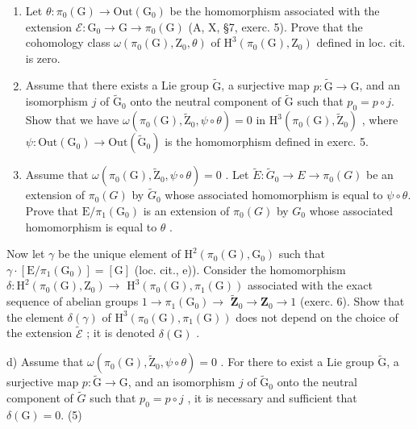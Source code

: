 \begin{enumerate}
\def\labelenumi{\alph{enumi})}
\item
  Let \(\theta\colon\pi_{0}(\mathrm{G})\to\mathrm{Out}(\mathrm{G}_{0})\) be the homomorphism associated with the extension \(\mathcal{E}\colon\mathrm{G}_{0}\to\mathrm{G}\to\pi_{0}(\mathrm{G})\) (A, X, §7, exerc. 5). Prove that the cohomology class \(\omega(\pi_{0}(\mathrm{G}),\mathrm{Z}_{0},\theta)\) of \(\mathrm{H}^{3}(\pi_{0}(\mathrm{G}),\mathrm{Z}_{0})\) defined in loc. cit. is zero.
\item
  Assume that there exists a Lie group \(\widetilde{\mathrm{G}}\), a surjective map \(p\colon\widetilde{\mathrm{G}}\to\mathrm{G}\), and an isomorphism \(j\) of \(\widetilde{\mathrm{G}}_{0}\) onto the neutral component of \(\widetilde{\mathrm{G}}\) such that \(p_{0}=p\circ j\). Show that we have \(\omega(\pi_{0}(\mathrm{G}),\widetilde{\mathrm{Z}}_{0},\psi\circ\theta)=0\) in \(\mathrm{H}^{3}(\pi_{0}(\mathrm{G}),\widetilde{\mathrm{Z}}_{0})\) , where \(\psi\colon\mathrm{Out}(\mathrm{G}_{0})\to\mathrm{Out}(\widetilde{\mathrm{G}}_{0})\) is the homomorphism defined in exerc. 5.
\item
  Assume that \(\omega(\pi_{0}(\mathrm{G}),\widetilde{\mathrm{Z}}_{0},\psi\circ\theta)=0\) . Let \(\widetilde{E}\colon\widetilde{G}_{0}\to E\to\pi_{0}(G)\) be an extension of \(\pi_{0}(G)\) by \(\widetilde{G}_{0}\) whose associated homomorphism is equal to \(\psi\circ\theta\). Prove that \(\mathrm{E}/\pi_{1}(\mathrm{G}_{0})\) is an extension of \(\pi_{0}(G)\) by \(G_{0}\) whose associated homomorphism is equal to \(\theta\) .
\end{enumerate}

Now let \(\gamma\) be the unique element of \(\mathrm{H}^2 (\pi_0(\mathrm{G}),\mathrm{G}_0)\) such that \(\gamma \cdot [\mathrm{E} / \pi_1(\mathrm{G}_0)] = [\mathrm{G}]\) (loc. cit., e)). Consider the homomorphism \(\delta \colon \mathrm{H}^2 (\pi_0(\mathrm{G}),\mathrm{Z}_0)\to\) \(\mathrm{H}^3 (\pi_0(\mathrm{G}),\pi_1(\mathrm{G}))\) associated with the exact sequence of abelian groups \(1\to \pi_1(\mathrm{G}_0)\to\) \(\widetilde{\mathbf{Z}}_0\to \mathbf{Z}_0\to 1\) (exerc. 6). Show that the element \(\delta (\gamma)\) of \(\mathrm{H}^3 (\pi_0(\mathrm{G}),\pi_1(\mathrm{G}))\) does not depend on the choice of the extension \(\widetilde{\mathcal{E}}\) ; it is denoted \(\delta (\mathrm{G})\) .

d) Assume that \(\omega (\pi_0(\mathrm{G}),\widetilde{\mathrm{Z}}_0,\psi \circ \theta) = 0\) . For there to exist a Lie group \(\widetilde{\mathrm{G}}\), a surjective map \(p\colon \widetilde{\mathrm{G}}\to \mathrm{G}\), and an isomorphism \(j\) of \(\widetilde{\mathrm{G}}_0\) onto the neutral component of \(\widetilde{G}\) such that \(p_{0}=p\circ j\) , it is necessary and sufficient that \(\delta(\mathrm{G})=0.\) (5)

